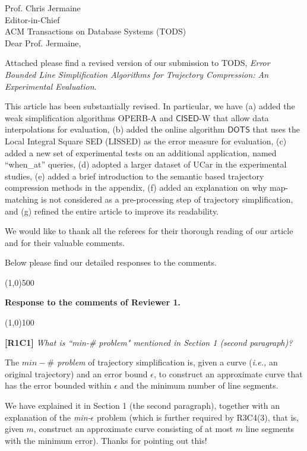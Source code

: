 \documentclass{letter}
\newcommand{\kw}[1]{{\ensuremath {\mathsf{#1}}}\xspace}
\newcommand{\ie}{\emph{i.e.,}\xspace}
\begin{document}
Prof. {Chris Jermaine} \\
Editor-in-Chief		\\
ACM Transactions on Database Systems (TODS)	\\



Dear Prof. Jermaine,

Attached please find a revised version of our submission to
TODS, \emph{Error Bounded Line Simplification Algorithms for Trajectory Compression: An Experimental Evaluation}.


 This article has been substantially revised. In particular, we have
	(a) added the weak simplification algorithms OPERB-A and \kw{CISED}-{W} that allow data interpolations for evaluation,
	(b) added the online algorithm \kw{DOTS} that uses the Local Integral Square SED (LISSED) as the error measure for evaluation,
	(c) added a new set of experimental tests on an additional application, named ``when\_at'' queries,
	(d) adopted a larger dataset of UCar in the experimental studies,
	(e) added a brief introduction to the semantic based trajectory compression methods in the appendix,
    (f) added an explanation on why map-matching is not considered as a pre-processing step of trajectory simplification, and
    (g)  refined the entire article to improve its readability.


We would like to thank all the referees for their thorough reading of our article and for their valuable comments.

Below please find our detailed responses to the comments.



\line(1,0){500}

\textbf{Response to the comments of Reviewer 1.}

\line(1,0){100}


\textbf{[R1C1]} \emph{What is ``min-\# problem" mentioned in Section 1 (second paragraph)?}


The \emph{$min-\#$ problem} of trajectory simplification is, given a curve (\ie an original trajectory) and an error bound $\epsilon$, to construct an approximate curve that has the error bounded within $\epsilon$ and the minimum number of line segments.

We have explained it in Section 1 (the second paragraph), together with an explanation of the \emph{min-$\epsilon$} problem (which is further required by R3C4(3), that is, given $m$, construct an approximate curve consisting of at most $m$ line segments with the minimum error).
Thanks for pointing out this!
\end{document}
